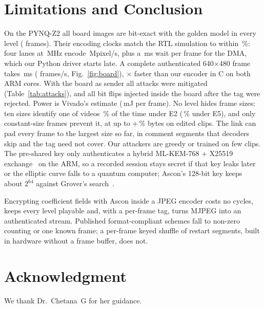\documentclass[conference]{IEEEtran}
\begin{document}
\section{Limitations and Conclusion}\label{sec:concl}
On the PYNQ-Z2 all \BdImages{} board images are bit-exact with the golden model in every level (\BdFramesTotal{} frames). Their encoding clocks match the RTL simulation to within \BdBusyVsRtlMaxPct\,\%: four lanes at \BdFourMhz\,MHz encode \BdFourBusyMpix\,Mpixel/s, plus a \BdFourWaitMs\,ms wait per frame for the DMA, which our Python driver starts late. A complete authenticated 640$\times$480 frame takes \BdFourZcMs\,ms (\BdFourZcFps{} frames/s, Fig.~\ref{fig:board}), \BdSpeedupFrame$\times$ faster than our encoder in C on both ARM cores. With the board as sender all attacks were mitigated (Table~\ref{tab:attacks}), and all \BdTamperShots{} bit flips injected inside the board after the tag were rejected. Power is Vivado's estimate (\BdEnergyEtwoMj\,mJ per frame). No level hides frame sizes: ten sizes identify one of \FpVideos{} videos \FpEtwoTen\,\% of the time under E2 (\FpEfiveTen\,\% under E5), and only constant-size frames prevent it, at up to $+$\PadFilmMax\,\% bytes on edited clips. The link can pad every frame to the largest size so far, in comment segments that decoders skip and the tag need not cover. Our attackers are greedy or trained on few clips. The pre-shared key only authenticates a hybrid ML-KEM-768 + X25519 exchange~\cite{fips203} on the ARM, so a recorded session stays secret if that key leaks later or the elliptic curve falls to a quantum computer; Ascon's 128-bit key keeps about $2^{64}$ against Grover's search~\cite{grover1996}.

Encrypting coefficient fields with Ascon inside a JPEG encoder costs no cycles, keeps every level playable and, with a per-frame tag, turns MJPEG into an authenticated stream. Published format-compliant schemes fall to non-zero counting or one known frame; a per-frame keyed shuffle of restart segments, built in hardware without a frame buffer, does not.

\section*{Acknowledgment}
We thank Dr.~Chetana~G for her guidance. 



\end{document}
